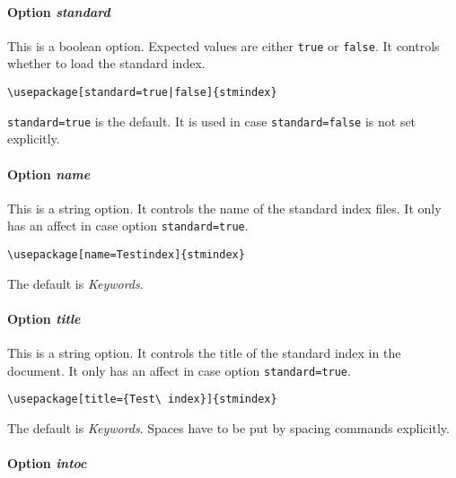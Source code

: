 \documentclass[%
  type=article,%
  layout=koma,%
  date=true,%
  hyperref=true,%
  index=false,%
  listings=true%
]{stmtext}
\begin{document}
\paragraph{Option \protect\textit{standard}} 
\label{sec:usage:preamble:options:standard}

This is a boolean option. Expected values are either \texttt{true} or \texttt{false}. It controls whether to load the standard index.

\begin{verbatim}
\usepackage[standard=true|false]{stmindex}
\end{verbatim}

\texttt{standard=true} is the default. It is used in case \texttt{standard=false} is not set explicitly.

\paragraph{Option \protect\textit{name}} 
\label{sec:usage:preamble:options:name}

This is a string option. It controls the name of the standard index files. It only has an affect in case option \texttt{standard=true}.

\begin{verbatim}
\usepackage[name=Testindex]{stmindex}
\end{verbatim}

The default is \textit{Keywords}.

\paragraph{Option \protect\textit{title}} 
\label{sec:usage:preamble:options:title}

This is a string option. It controls the title of the standard index in the document. It only has an affect in case option \texttt{standard=true}.

\begin{verbatim}
\usepackage[title={Test\ index}]{stmindex}
\end{verbatim}

The default is \textit{Keywords}. Spaces have to be put by spacing commands explicitly.

\paragraph{Option \protect\textit{intoc}} 
\label{sec:usage:preamble:options:intoc}
\end{document}
